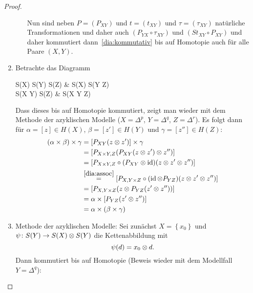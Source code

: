 \begin{proof}
\begin{enumerate}
\begin{enumerate}
          Nun sind neben $P = (P_{XY})$ und $t = (t_{XY})$ und $\tau = (\tau_{XY})$ natürliche Transformationen und daher auch $(P_{YX} \circ \tau_{XY})$ und $(S t_{XY} \circ P_{XY})$ und daher kommutiert dann~\eqref{dia:kommutativ} bis auf Homotopie auch für alle Paare $(X,Y)$.
      \end{enumerate}
    \item
      Betrachte das Diagramm
      \begin{cd*}
        \label{dia:assoc}
        \tag{$\ast\ast$}
        S(X) \tensor S(Y) \tensor S(Z)
        \ar[r, "\id \tensor P_{YZ}"]
        \ar[d, "P_{XY} \tensor \id"]
        & S(X) \tensor S(Y \times Z)
        \ar[d, "P_{X, Y \times Z}"]
        \\
        S(X \times Y) \tensor S(Z)
        \ar[r, "P_{X \times Y, Z}"]
        & S(X \times Y \times Z)
      \end{cd*}
      Dass dieses bis auf Homotopie kommutiert, zeigt man wieder mit dem Methode der azyklischen Modelle ($X = \Delta^p$, $Y = \Delta^q$, $Z = \Delta^r$).
      Es folgt dann für $\alpha = [z] \in H(X)$, $\beta = [z'] \in H(Y)$ und $\gamma = [z''] \in H(Z)$:
      \begin{align*}
        (\alpha \times \beta) \times \gamma
        & = [ P_{XY} (z \otimes z') ] \times \gamma \\
        & = [ P_{X \times Y, Z} (P_{XY} (z \otimes z') \otimes z'') ] \\
        & = [P_{X \times Y, Z}  \circ (P_{XY} \otimes \operatorname{id}) (z \otimes z' \otimes z'') ] \\
        & \overset{\eqref{dia:assoc}}{=}
        [P_{X, Y \times Z} \circ (\operatorname{id} \otimes P_{YZ}) (z \otimes z' \otimes z'') ] \\
        & = [P_{X, Y \times Z} (z \otimes P_{YZ} (z' \otimes z'')) ] \\
        & = \alpha \times [ P_{YZ} (z' \otimes z'') ] \\
        & = \alpha \times (\beta \times \gamma)
      \end{align*}
    \item
      Methode der azyklischen Modelle:
      Sei zunächst $X = \left\{ x_0 \right\}$ und $\psi \colon S(Y) \to S(X) \otimes S(Y)$ die Kettenabbildung mit
      \begin{equation*}
        \psi(d) = x_0 \otimes d.
      \end{equation*}
      Dann kommutiert bis auf Homotopie (Beweis wieder mit dem Modellfall $Y = \Delta^q$):
      \begin{cd*}

\end{cd*}
\end{enumerate}
\end{proof}
